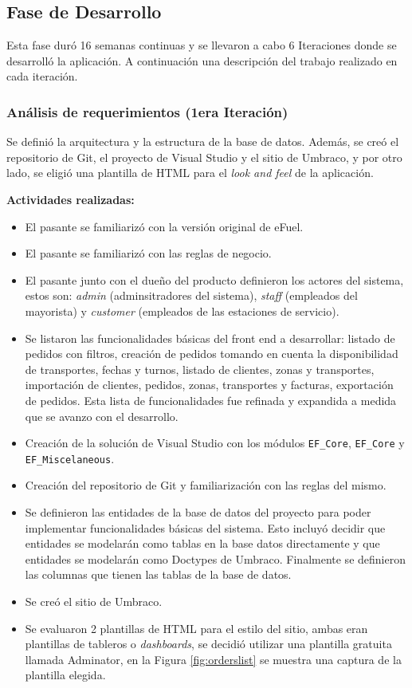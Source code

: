 \subsection{Fase de Desarrollo}
Esta fase duró 16 semanas continuas y se llevaron a cabo 6 Iteraciones donde se desarrolló la aplicación. A continuación una descripción del trabajo realizado en cada iteración.

\subsubsection{Análisis de requerimientos (1era Iteración)}
Se definió la arquitectura y la estructura de la base de datos. Además, se creó el repositorio de Git, el proyecto de Visual Studio y el sitio de Umbraco, y por otro lado, se eligió una plantilla de HTML para el \emph{look and feel} de la aplicación.

\vspace{0.3cm}
\textbf{Actividades realizadas:}
\begin{itemize}
    \item El pasante se familiarizó con la versión original de eFuel.
    \item El pasante se familiarizó con las reglas de negocio.
    \item El pasante junto con el dueño del producto definieron los actores del sistema, estos son: \emph{admin} (adminsitradores del sistema), \emph{staff} (empleados del mayorista) y \emph{customer} (empleados de las estaciones de servicio).
    \item Se listaron las funcionalidades básicas del front end a desarrollar: listado de pedidos con filtros, creación de pedidos tomando en cuenta la disponibilidad de transportes, fechas y turnos, listado de clientes, zonas y transportes, importación de clientes, pedidos, zonas, transportes y facturas, exportación de pedidos. Esta lista de funcionalidades fue refinada y expandida a medida que se avanzo con el desarrollo.
    \item Creación de la solución de Visual Studio con los módulos \verb|EF_Core|, \verb|EF_Core| y \verb|EF_Miscelaneous|.
    \item Creación del repositorio de Git y familiarización con las reglas del mismo.
    \item Se definieron las entidades de la base de datos del proyecto para poder implementar funcionalidades básicas del sistema. Esto incluyó decidir que entidades se modelarán como tablas en la base datos directamente y que entidades se modelarán como Doctypes de Umbraco. Finalmente se definieron las columnas que tienen las tablas de la base de datos.
    \item Se creó el sitio de Umbraco.
    \item Se evaluaron 2 plantillas de HTML para el estilo del sitio, ambas eran plantillas de tableros o \emph{dashboards}, se decidió utilizar una plantilla gratuita llamada Adminator, en la Figura \ref{fig:orderslist} se muestra una captura de la plantilla elegida.
\end{itemize}

